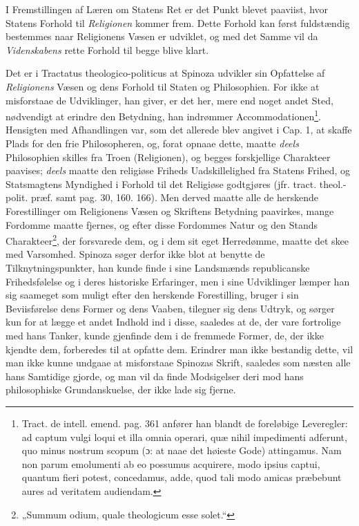\documentclass[12pt,a4paper]{book}
\newcommand{\opage}[1]{\marginnote{\footnotesize\textit{[#1]}}}
\begin{document}
I Fremstillingen af Læren om Statens Ret er det Punkt blevet paaviist, hvor Statens Forhold til \emph{Religionen} kommer frem. Dette Forhold kan først fuldstændig bestemmes naar Religionens Væsen er udviklet, og med det Samme vil da \emph{Videnskabens} rette Forhold til begge blive klart.

Det er i Tractatus theologico-politicus at Spinoza udvikler sin Opfattelse af \emph{Religionens} Væsen og dens Forhold til Staten og Philosophien. For ikke at misforstaae de Udviklinger, han giver, er det her, mere end noget andet Sted, nødvendigt at erindre den Betydning, han indrømmer Accommodationen\footnote{Tract. de intell. emend. pag. 361 anfører han blandt de foreløbige Leveregler: ad captum vulgi loqui et illa omnia operari, quæ nihil impedimenti adferunt, quo minus nostrum scopum (ɔ: at naae det høieste Gode) attingamus. Nam non parum emolumenti ab eo possumus acquirere, modo ipsius captui, quantum fieri potest, concedamus, adde, quod tali modo amicas præbebunt aures ad veritatem audiendam.}. Hensigten med Afhandlingen var, som det allerede blev angivet i Cap. 1, at skaffe Plads for den frie Philosopheren, og, forat opnaae dette, maatte \emph{deels} Philosophien skilles fra Troen (Religionen), og begges forskjellige Charakteer paavises; \emph{deels} maatte den religiøse Friheds Uadskillelighed fra Statens Frihed, og Statsmagtens Myndighed i Forhold til det Religiøse godtgjøres (jfr. tract. theol.-polit. præf. samt pag. 30, 160. 166). Men derved maatte alle de herskende Forestillinger om Religionens
\opage{147} \setcounter{footnote}{0}%
Væsen og Skriftens Betydning paavirkes, mange Fordomme maatte fjernes, og efter disse Fordommes Natur og den Stands Charakteer\footnote{„Summum odium, quale theologicum esse solet.“}, der forsvarede dem, og i dem sit eget Herredømme, maatte det skee med Varsomhed. Spinoza søger derfor ikke blot at benytte de Tilknytningspunkter, han kunde finde i sine Landsmænds republicanske Frihedsfølelse og i deres historiske Erfaringer, men i sine Udviklinger læmper han sig saameget som muligt efter den herskende Forestilling, bruger i sin Beviisførelse dens Former og dens Vaaben, tilegner sig dens Udtryk, og sørger kun for at lægge et andet Indhold ind i disse, saaledes at de, der vare fortrolige med hans Tanker, kunde gjenfinde dem i de fremmede Former, de, der ikke kjendte dem, forberedes til at opfatte dem. Erindrer man ikke bestandig dette, vil man ikke kunne undgaae at misforstaae Spinozas Skrift, saaledes som næsten alle hans Samtidige gjorde, og man vil da finde Modsigelser deri mod hans philosophiske Grundanskuelse, der ikke lade sig fjerne.
\end{document}
